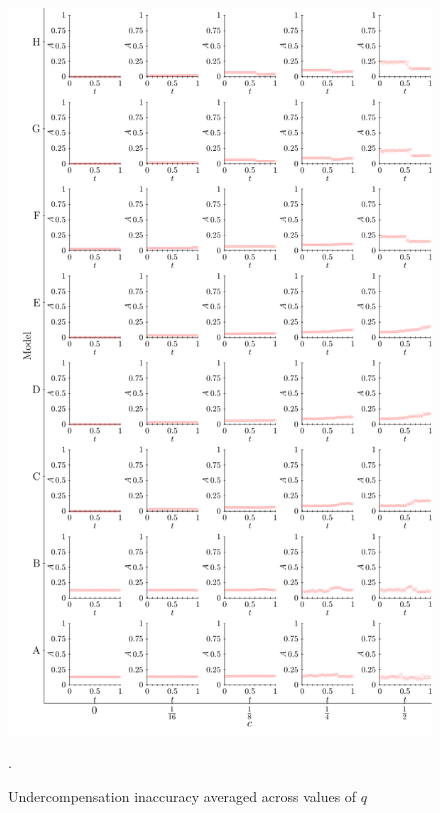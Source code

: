 \documentclass{article}
\begin{document}
\begin{figure}[h!]
\centering
\includegraphics[scale=0.55, trim={0.05in 0.15in 0in 0in}, clip]{../Figures/CostInclusiveAccuracy.pdf}
\vspace*{-2mm}
\caption{Undercompensation inaccuracy averaged across values of $q$}. 
\label{fig:undercompensationaccuracy}
\end{figure}
\end{document}
